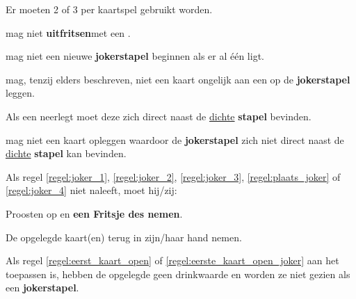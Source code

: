 \vervolgLijst{}
    \item Er moeten 2 of 3 \footnotemark[2] per kaartspel gebruikt worden.
\eindLijst{}

\vervolgLijst{}
    \item \EenSpeler mag niet \textbf{uitfritsen}\footnotemark[3] met een \footnotemark[2].
    \label{regel:joker_1}
\eindLijst{}

\vervolgLijst{}
    \item \EenSpeler mag niet een nieuwe \textbf{jokerstapel} beginnen als er al \'e\'en ligt.
    \label{regel:joker_2}
\eindLijst{}

\vervolgLijst{}
    \item \EenSpeler mag, tenzij elders beschreven, niet een kaart ongelijk aan een \footnotemark[2] op de \textbf{jokerstapel} leggen.
    \label{regel:joker_3}
\eindLijst{}

\vervolgLijst{}
    \item Als \eenSpeler een \footnotemark[2] neerlegt moet deze zich direct naast de \ul{dichte} \textbf{stapel} bevinden.
    \label{regel:plaats_joker}
\eindLijst{}

\vervolgLijst{}
    \item \EenSpeler mag niet een kaart opleggen waardoor de \textbf{jokerstapel} zich niet direct naast de \ul{dichte} \textbf{stapel} kan bevinden.
    \label{regel:joker_4}
\eindLijst{}

\vervolgLijst{}
    \item Als \eenSpeler regel \ref{regel:joker_1}, \ref{regel:joker_2}, \ref{regel:joker_3}, \ref{regel:plaats_joker} of \ref{regel:joker_4} niet naleeft, moet hij/zij:
    \puntLijst{}
        \item Proosten op  en \textbf{een Fritsje des nemen}\footnotemark[4].
        \item De opgelegde kaart(en) terug in zijn/haar hand nemen.
    \eindPuntLijst{}
    \label{regel:kaarten_terugnemen_3}
\eindLijst{}


\vervolgLijst{}
    \item Als \Frits regel \ref{regel:eerst_kaart_open} of \ref{regel:eerste_kaart_open_joker} aan het toepassen is, hebben de opgelegde \footnotemark[2] geen drinkwaarde en worden ze niet gezien als een \textbf{jokerstapel}.
\eindLijst{}   

